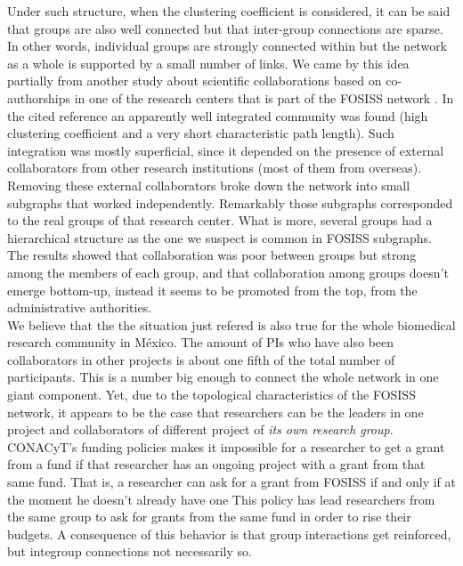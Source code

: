 \documentclass[11pt]{article}
\begin{document}
{{\color{red}Under such structure, when the clustering coefficient is
  considered, it can be said that groups are also well connected but
  that inter-group connections are sparse. In other words, individual
  groups are strongly connected within but the network as a whole is
  supported by a small number of links. We came by this idea partially
  from another study about scientific collaborations based on
  co-authorships in one of the research centers that is part of the
  FOSISS network \cite{HernandezLemus2013}. In the cited reference an
  apparently well integrated community was found (high clustering
  coefficient and a very short characteristic path length). Such
  integration was mostly superficial, since it depended on the
  presence of external collaborators from other research institutions
  (most of them from overseas).  Removing these external collaborators
  broke down the network into small subgraphs that worked
  independently. Remarkably those subgraphs corresponded to the real
  groups of that research center.  What is more, several groups had a
  hierarchical structure as the one we suspect is common in FOSISS
  subgraphs. The results showed that collaboration was poor between
  groups but strong among the members of each group, and that
  collaboration among groups doesn't emerge bottom-up, instead it
  seems to be promoted from the top, from the administrative
  authorities.}\\

{\color{red}We believe that the the situation just refered is also
  true for the whole biomedical research community in M\'exico. The
  amount of PIs who have also been collaborators in other projects is
  about one fifth of the total number of participants.  This is a
  number big enough to connect the whole network in one giant
  component. Yet, due to the topological characteristics of the FOSISS
  network, it appears to be the case that researchers can be the
  leaders in one project and collaborators of different project of
  \emph{its own research group}. CONACyT's funding policies makes it
  impossible for a researcher to get a grant from a fund if that
  researcher has an ongoing project with a grant from that same
  fund. That is, a researcher can ask for a grant from FOSISS if and
  only if at the moment he doesn't already have one
  This policy has lead researchers from the same group to ask
  for grants from the same fund in order to rise their budgets. A
  consequence of this behavior is that group interactions get
  reinforced, but integroup connections not necessarily so.}\\

}
\end{document}
